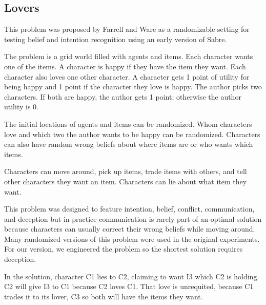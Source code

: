 \documentclass{nilreport}
\makeatletter
\renewcommand{\bibentry}[1]{\nocite{#1}{\frenchspacing\@nameuse{BR@r@#1\@extra@b@citeb}}}
\makeatother
\begin{document}
\subsection{Lovers}

This problem was proposed by Farrell and Ware as a randomizable setting
for testing belief and intention recognition using an early version
of Sabre.

\begin{quote}
	\bibentry{farrell2020narrative}
\end{quote}

\noindent The problem is a grid world filled with agents and items.
Each character wants one of the items. A character is happy if they
have the item they want. Each character also loves one other character.
A character gets 1 point of utility for being happy and 1 point if
the character they love is happy. The author picks two characters.
If both are happy, the author gets 1 point; otherwise the author utility
is 0.

The initial locations of agents and items can be randomized. Whom
characters love and which two the author wants to be happy can be
randomized. Characters can also have random wrong beliefs about where
items are or who wants which items.

Characters can move around, pick up items, trade items with others,
and tell other characters they want an item. Characters can lie about
what item they want.

This problem was designed to feature intention, belief, conflict,
communication, and deception but in practice communication is rarely
part of an optimal solution because characters can usually correct
their wrong beliefs while moving around. Many randomized versions
of this problem were used in the original experiments. For our version,
we engineered the problem so the shortest solution requires deception.

In the solution, character C1 lies to C2, claiming to want I3 which
C2 is holding. C2 will give I3 to C1 because C2 loves C1. That love
is unrequited, because C1 trades it to its lover, C3 so both will
have the items they want.

\medskip{}
\noindent{}
\end{document}
